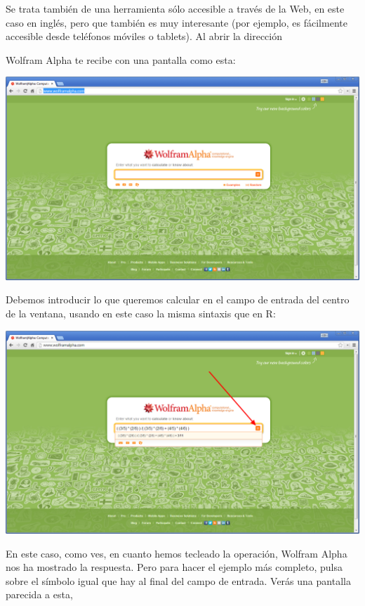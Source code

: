 \documentclass[10pt,a4paper]{article}\usepackage[]{graphicx}\usepackage[]{color}
\begin{document}
Se trata también de una herramienta sólo accesible a través de la Web, en este caso en inglés, pero que también es muy interesante (por ejemplo, es fácilmente accesible desde teléfonos móviles o tablets). Al abrir la dirección
\begin{center}
\end{center}
Wolfram Alpha te recibe con una pantalla como esta:
     \begin{center}
\includegraphics[width=15.5cm]{./fig/Tut04-15.png}
\end{center}
Debemos introducir lo que queremos calcular en el campo de entrada del centro de la ventana, usando en este caso la misma sintaxis que en R:
     \begin{center}
\includegraphics[width=15.5cm]{./fig/Tut04-16.png}
\end{center}
En este caso, como ves, en cuanto hemos tecleado la operación, Wolfram Alpha nos ha mostrado la respuesta. Pero para hacer el ejemplo más completo, pulsa sobre el símbolo igual que hay al final del campo de entrada. Verás una pantalla parecida a esta,
\end{document}
